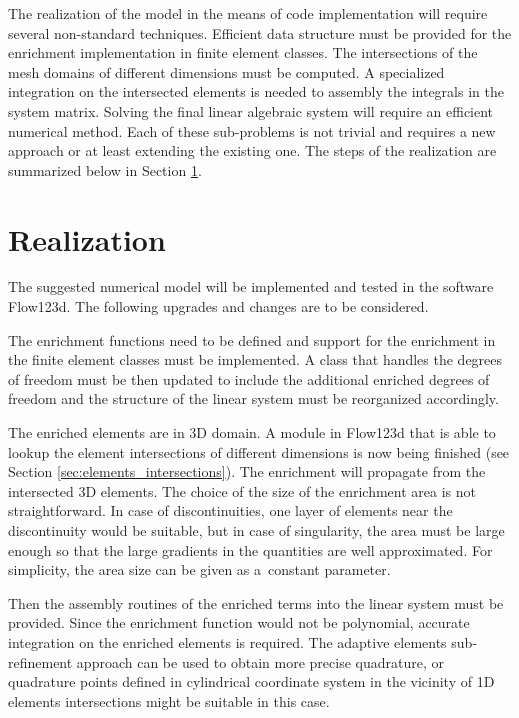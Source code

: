 \documentclass[FM,Dis]{tulthesis}
\begin{document}
The realization of the model in the means of code implementation will require several non-standard techniques.
Efficient data structure must be provided for the enrichment implementation in finite element classes.
The intersections of the mesh domains of different dimensions must be computed. A specialized integration
on the intersected elements is needed to assembly the integrals in the system matrix. 
Solving the final linear algebraic system will require an efficient numerical method.
Each of these sub-problems is not trivial and requires a new approach or at least extending the existing one.
The steps of the realization are summarized below in Section \ref{sec:realization}.

\section{Realization} \label{sec:realization}
The suggested numerical model will be implemented and tested in the software Flow123d.
The following upgrades and changes are to be considered.

The enrichment functions need to be defined and support for the enrichment in the finite element classes must be implemented. 
A class that handles the degrees of freedom must be then updated to include the additional enriched degrees of freedom
and the structure of the linear system must be reorganized accordingly.

The enriched elements are in 3D domain. A module in Flow123d that is able to lookup the element intersections
of different dimensions is now being finished (see Section \ref{sec:elements_intersections}). The enrichment will propagate from the intersected 3D elements.
The choice of the size of the enrichment area is not straightforward. In case of discontinuities, one layer of elements
near the discontinuity would be suitable, but in case of singularity, the area must be large enough so that 
the large gradients in the quantities are well approximated. For simplicity, the area size can be given as
a~constant parameter.

Then the assembly routines of the enriched terms into the linear system must be provided.
Since the enrichment function would not be polynomial, accurate integration on the enriched elements is required. 
The adaptive elements sub-refinement approach can be used to obtain more precise quadrature, 
or quadrature points defined in cylindrical coordinate system in the vicinity of 1D elements intersections
might be suitable in this case.
\end{document}
